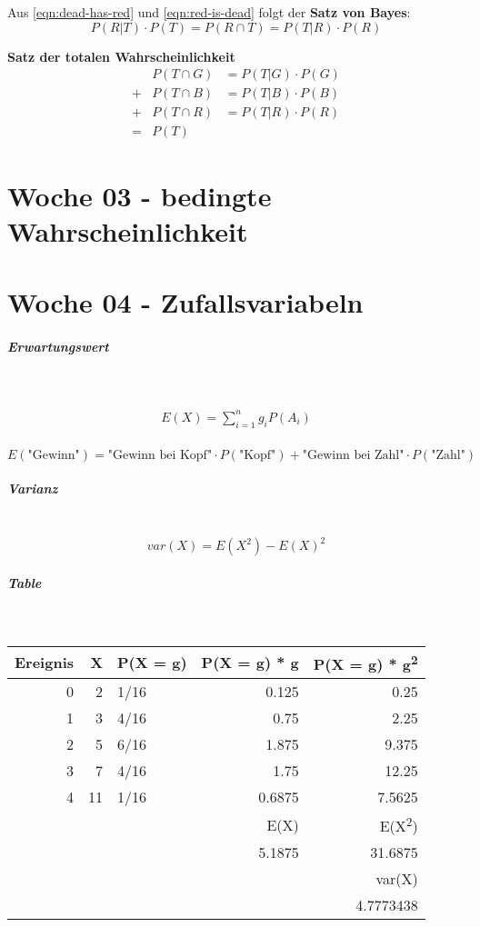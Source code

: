 \documentclass[11pt,twoside,landscape]{article}
\begin{document}
Aus \ref{eqn:dead-has-red} und \ref{eqn:red-is-dead} folgt der \textbf{Satz von Bayes}:
\[
P(R|T) \cdot P(T) = P(R \cap T) = P(T|R) \cdot P(R)
\]

\textbf{Satz der totalen Wahrscheinlichkeit}
\begin{align*}
&P(T \cap G) &= P(T|G) \cdot P(G) \\
+&P(T \cap B) &= P(T|B) \cdot P(B) \\
+&P(T \cap R) &= P(T|R) \cdot P(R) \\
=&P(T)
\end{align*}
\section{Woche 03 - bedingte Wahrscheinlichkeit}
\label{sec:org6d52b59}
\section{Woche 04 - Zufallsvariabeln}
\label{sec:orgbbe27b2}
\subparagraph{Erwartungswert} \
\label{sec:org520fe5e}

\begin{equation}
\begin{split} \label{eqn:erwartungs-wert}
E(X) = \sum_{i=1}^{n}g_iP(A_i) \\
\end{split} 
\end{equation}

\[
E(\text{"Gewinn"})=\text{"Gewinn bei Kopf"}\cdot P(\text{"Kopf"})
+\text{"Gewinn bei Zahl"}\cdot P(\text{"Zahl"})
\]
\subparagraph{Varianz} \
\label{sec:org4912069}
\[
var(X) = E(X^2) - E(X)^2
\]
\subparagraph{Table} \
\label{sec:orgd08a1cc}

\begin{center}
\begin{tabular}{rrlrr}
Ereignis & X & P(X = g) & P(X = g) * g & P(X = g) * g\textsuperscript{2}\\[0pt]
\hline
0 & 2 & 1/16 & 0.125 & 0.25\\[0pt]
1 & 3 & 4/16 & 0.75 & 2.25\\[0pt]
2 & 5 & 6/16 & 1.875 & 9.375\\[0pt]
3 & 7 & 4/16 & 1.75 & 12.25\\[0pt]
4 & 11 & 1/16 & 0.6875 & 7.5625\\[0pt]
\hline
 &  &  & E(X) & E(X\textsuperscript{2})\\[0pt]
 &  &  & 5.1875 & 31.6875\\[0pt]
 &  &  &  & var(X)\\[0pt]
 &  &  &  & 4.7773438\\[0pt]
\end{tabular}
\end{center}
\end{document}
